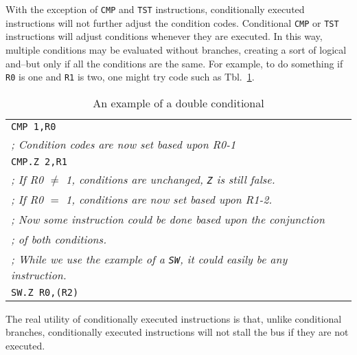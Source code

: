 \documentclass{gqtekspec}
\begin{document}
With the exception of \hbox{\tt CMP} and \hbox{\tt TST} instructions,
conditionally executed instructions will not further adjust the condition
codes.  Conditional \hbox{\tt CMP} or \hbox{\tt TST} instructions will adjust
conditions whenever they are executed.  In this way, multiple conditions may
be evaluated without branches, creating a sort of logical and--but only if all
the conditions are the same.  For example, to do something if \hbox{\tt R0} is
one and \hbox{\tt R1} is two, one might try code such as
Tbl.~\ref{tbl:dbl-condition}.
\begin{table}\begin{center}
\begin{tabular}{l}
	{\tt CMP 1,R0} \\
	{\em ; Condition codes are now set based upon R0-1} \\
	{\tt CMP.Z 2,R1} \\
	{\em ; If R0 $\neq$ 1, conditions are unchanged, {\tt Z} is still false.} \\
	{\em ; If R0 $=$ 1, conditions are now set based upon R1-2.} \\
	{\em ; Now some instruction could be done based upon the conjunction} \\
	{\em ; of both conditions.} \\
	{\em ; While we use the example of a {\tt SW}, it could easily be any
		instruction.} \\
	{\tt SW.Z R0,(R2)} \\
\end{tabular}
\caption{An example of a double conditional}\label{tbl:dbl-condition}
\end{center}\end{table}

The real utility of conditionally executed instructions is that, unlike
conditional branches, conditionally executed instructions will not stall
the bus if they are not executed.
\end{document}
